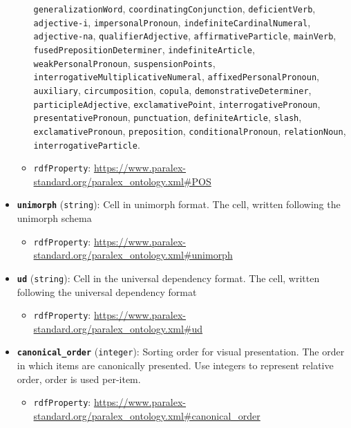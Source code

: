 \begin{itemize}
\begin{itemize}
    \texttt{generalizationWord}, \texttt{coordinatingConjunction},
    \texttt{deficientVerb}, \texttt{adjective-i},
    \texttt{impersonalPronoun}, \texttt{indefiniteCardinalNumeral},
    \texttt{adjective-na}, \texttt{qualifierAdjective},
    \texttt{affirmativeParticle}, \texttt{mainVerb},
    \texttt{fusedPrepositionDeterminer}, \texttt{indefiniteArticle},
    \texttt{weakPersonalPronoun}, \texttt{suspensionPoints},
    \texttt{interrogativeMultiplicativeNumeral},
    \texttt{affixedPersonalPronoun}, \texttt{auxiliary},
    \texttt{circumposition}, \texttt{copula},
    \texttt{demonstrativeDeterminer}, \texttt{participleAdjective},
    \texttt{exclamativePoint}, \texttt{interrogativePronoun},
    \texttt{presentativePronoun}, \texttt{punctuation},
    \texttt{definiteArticle}, \texttt{slash},
    \texttt{exclamativePronoun}, \texttt{preposition},
    \texttt{conditionalPronoun}, \texttt{relationNoun},
    \texttt{interrogativeParticle}.
  \item
    \texttt{rdfProperty}:
    \url{https://www.paralex-standard.org/paralex_ontology.xml\#POS}
  \end{itemize}
\item
  \textbf{\texttt{unimorph}} (\texttt{string}): Cell in unimorph format.
  The cell, written following the unimorph schema

  \begin{itemize}
  \tightlist
  \item
    \texttt{rdfProperty}:
    \url{https://www.paralex-standard.org/paralex_ontology.xml\#unimorph}
  \end{itemize}
\item
  \textbf{\texttt{ud}} (\texttt{string}): Cell in the universal
  dependency format. The cell, written following the universal
  dependency format

  \begin{itemize}
  \tightlist
  \item
    \texttt{rdfProperty}:
    \url{https://www.paralex-standard.org/paralex_ontology.xml\#ud}
  \end{itemize}
\item
  \textbf{\texttt{canonical\_order}} (\texttt{integer}): Sorting order
  for visual presentation. The order in which items are canonically
  presented. Use integers to represent relative order, order is used
  per-item.

  \begin{itemize}
  \tightlist
  \item
    \texttt{rdfProperty}:
    \url{https://www.paralex-standard.org/paralex_ontology.xml\#canonical_order}
  \end{itemize}
\end{itemize}

